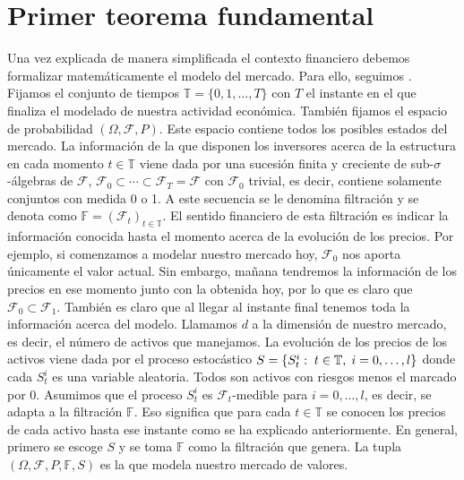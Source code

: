 \section{Primer teorema fundamental}
Una vez explicada de manera simplificada el contexto financiero debemos formalizar matemáticamente el modelo del mercado. Para ello, seguimos \cite{elliot1999mathematics}. Fijamos el conjunto de tiempos $ \mathbb{T} = \{0,1,\dots,T\}$ con $ T $ el instante en el que finaliza el modelado de nuestra actividad económica. También fijamos el espacio de probabilidad $ (\Omega, \mathcal{F}, P) $. Este espacio contiene todos los posibles estados del mercado. La información de la que disponen los inversores acerca de la estructura en cada momento $ t \in \mathbb{T}$ viene dada por una sucesión finita y creciente de sub-$ \sigma $-álgebras de $ \mathcal{F} $, $ \mathcal{F}_0 \subset \cdots \subset \mathcal{F}_T = \mathcal{F} $ con $ \mathcal{F}_0 $ trivial, es decir, contiene solamente conjuntos con medida 0 o 1. A este secuencia se le denomina filtración y se denota como $ \mathbb{F} = (\mathcal{F}_t)_{t \in \mathbb{T}} $. El sentido financiero de esta filtración es indicar la información conocida hasta el momento acerca de la evolución de los precios. Por ejemplo, si comenzamos a modelar nuestro mercado hoy, $ \mathcal{F}_0 $ nos aporta únicamente el valor actual. Sin embargo, mañana tendremos la información de los precios en ese momento junto con la obtenida hoy, por lo que es claro que $ \mathcal{F}_0 \subset \mathcal{F}_1  $. También es claro que al llegar al instante final tenemos toda la información acerca del modelo. Llamamos $ d  $ a la dimensión de nuestro mercado, es decir, el número de activos que manejamos. La evolución de los precios de los activos viene dada  por el proceso estocástico $ S = \{S^i_t:\hspace{1mm} t \in \mathbb{T},\hspace{1mm} i=0,\dots,l\} $ donde cada $ S^i_t $ es una variable aleatoria. Todos son activos con riesgos menos el marcado por $ 0 $. Asumimos que el proceso $ S_t^i $ es $ \mathcal{F}_t $-medible para $ i=0,\dots,l $, es decir, se adapta a la filtración $ \mathbb{F} $. Eso significa que para cada $ t \in \mathbb{T} $ se conocen los precios de cada activo hasta ese instante como se ha explicado anteriormente. En general, primero se escoge $ S $ y se toma $ \mathbb{F} $ como la filtración que genera. La tupla $ (\Omega, \mathcal{F}, P, \mathbb{F}, S) $ es la que modela nuestro mercado de valores. \\

